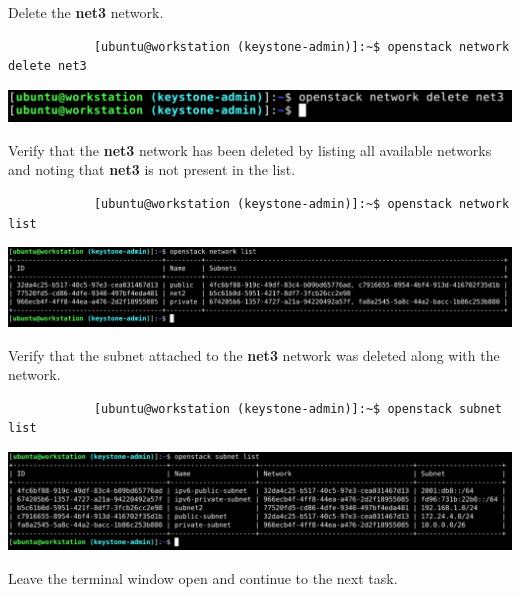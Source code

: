 \documentclass[letterpaper, 12pt]{article}
\begin{document}
\begin{enumerate}
    \begin{labstep}
        Delete the \textbf{net3} network.
        \begin{lstlisting}
            [ubuntu@workstation (keystone-admin)]:~$ openstack network delete net3
        \end{lstlisting}

        \begin{center}
            \includegraphics[width=\linewidth]{images/part3/step24.png}
        \end{center}
    \end{labstep}

    \begin{labstep}
        Verify that the \textbf{net3} network has been deleted by listing all available networks and noting that \textbf{net3} is not present in the list.
        \begin{lstlisting}
            [ubuntu@workstation (keystone-admin)]:~$ openstack network list
        \end{lstlisting}

        \begin{center}
            \includegraphics[width=\linewidth]{images/part3/step25.png}
        \end{center}
    \end{labstep}

    \begin{labstep}
        Verify that the subnet attached to the \textbf{net3} network was deleted along with the network.
        \begin{lstlisting}
            [ubuntu@workstation (keystone-admin)]:~$ openstack subnet list
        \end{lstlisting}

        \begin{center}
            \includegraphics[width=\linewidth]{images/part3/step26.png}
        \end{center}
    \end{labstep}

    \begin{labstep}
        Leave the terminal window open and continue to the next task.
    \end{labstep}

\end{enumerate}
\end{document}
